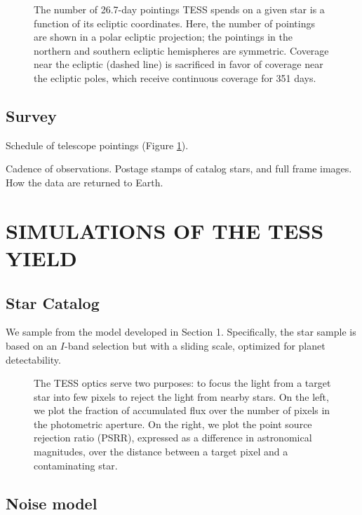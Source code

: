 \documentclass{emulateapj}
\begin{document}
\begin{figure}[ht]
\caption{The number of 26.7-day pointings TESS spends on a given star is a function of its ecliptic coordinates. Here, the number of pointings are shown in a polar ecliptic projection; the pointings in the northern and southern ecliptic hemispheres are symmetric. Coverage near the ecliptic (dashed line) is sacrificed in favor of coverage near the ecliptic poles, which receive continuous coverage for 351 days.}
\label{fig:npoint}
\end{figure}


\subsection{Survey} 

Schedule of telescope pointings (Figure \ref{fig:npoint}).

Cadence of observations. Postage stamps of catalog stars, and full
frame images.  How the data are returned to Earth.

\section{SIMULATIONS OF THE TESS YIELD}
\label{sec:yield}
\subsection{Star Catalog}

We sample from the model developed in Section 1.  Specifically, the
star sample is based on an $I$-band selection but with a sliding
scale, optimized for planet detectability.

\begin{figure*}[ht]
\caption{The TESS optics serve two purposes: to focus the light from a target star into few pixels to reject the light from nearby stars. On the left, we plot the fraction of accumulated flux over the number of pixels in the photometric aperture. On the right, we plot the point source rejection ratio (PSRR), expressed as a difference in astronomical magnitudes, over the distance between a target pixel and a contaminating star.}
\label{fig:npix}
\end{figure*}

\subsection{Noise model}
\end{document}
